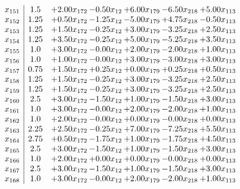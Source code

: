 \documentclass[8pt]{article}
\begin{document}
\[\begin{array}{c| c c@{\hskip 2pt} c@{\hskip 2pt} c@{\hskip 2pt} c@{\hskip 2pt} c@{\hskip 2pt} }
 x_{151}   &  1.5 & +  2.00 x_{172} & -0.50 x_{12} & +  6.00 x_{179} & -6.50 x_{218} & +  5.00 x_{113}\\
 x_{152}   &  1.25 & +  0.50 x_{172} & -1.25 x_{12} & -5.00 x_{179} & +  4.75 x_{218} & -0.50 x_{113}\\
 x_{153}   &  1.25 & +  1.50 x_{172} & -0.25 x_{12} & +  3.00 x_{179} & -3.25 x_{218} & +  2.50 x_{113}\\
 x_{154}   &  1.25 & +  3.50 x_{172} & -0.25 x_{12} & +  5.00 x_{179} & -5.25 x_{218} & +  3.50 x_{113}\\
 x_{155}   &  1.0 & +  3.00 x_{172} & -0.00 x_{12} & +  2.00 x_{179} & -2.00 x_{218} & +  1.00 x_{113}\\
 x_{156}   &  1.0 & +  1.00 x_{172} & -0.00 x_{12} & +  3.00 x_{179} & -3.00 x_{218} & +  3.00 x_{113}\\
 x_{157}   &  0.75 & +  1.50 x_{172} & +  0.25 x_{12} & +  0.00 x_{179} & +  0.25 x_{218} & +  0.50 x_{113}\\
 x_{158}   &  1.25 & +  1.50 x_{172} & -0.25 x_{12} & +  3.00 x_{179} & -3.25 x_{218} & +  2.50 x_{113}\\
 x_{159}   &  1.25 & +  1.50 x_{172} & -0.25 x_{12} & +  3.00 x_{179} & -3.25 x_{218} & +  2.50 x_{113}\\
 x_{160}   &  2.5 & +  3.00 x_{172} & -1.50 x_{12} & +  1.00 x_{179} & -1.50 x_{218} & +  3.00 x_{113}\\
 x_{161}   &  1.0 & +  3.00 x_{172} & -0.00 x_{12} & +  2.00 x_{179} & -2.00 x_{218} & +  1.00 x_{113}\\
 x_{162}   &  1.0 & +  2.00 x_{172} & -0.00 x_{12} & +  0.00 x_{179} & -0.00 x_{218} & +  0.00 x_{113}\\
 x_{163}   &  2.25 & +  2.50 x_{172} & -0.25 x_{12} & +  7.00 x_{179} & -7.25 x_{218} & +  5.50 x_{113}\\
 x_{164}   &  2.75 & +  0.50 x_{172} & -1.75 x_{12} & +  1.00 x_{179} & -1.75 x_{218} & +  4.50 x_{113}\\
 x_{165}   &  2.5 & +  3.00 x_{172} & -1.50 x_{12} & +  1.00 x_{179} & -1.50 x_{218} & +  3.00 x_{113}\\
 x_{166}   &  1.0 & +  2.00 x_{172} & +  0.00 x_{12} & +  0.00 x_{179} & -0.00 x_{218} & +  0.00 x_{113}\\
 x_{167}   &  2.5 & +  3.00 x_{172} & -1.50 x_{12} & +  1.00 x_{179} & -1.50 x_{218} & +  3.00 x_{113}\\
 x_{168}   &  1.0 & +  3.00 x_{172} & -0.00 x_{12} & +  2.00 x_{179} & -2.00 x_{218} & +  1.00 x_{113}\\

\end{array}\]
\end{document}

